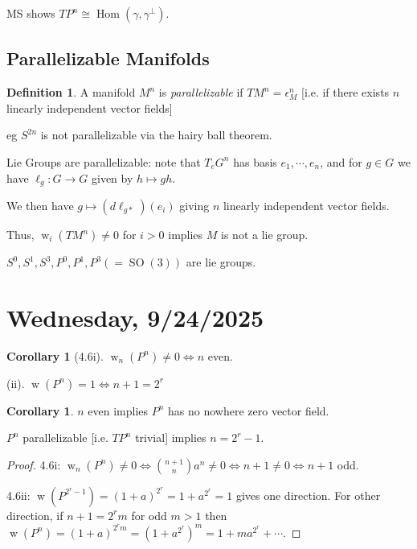 \documentclass{article}
\theoremstyle{definition}
\newtheorem*{definition}{Definition}
\newtheorem{corollary}[theorem]{Corollary}
\begin{document}
    MS shows \(TP^n \cong \operatorname{Hom} (\gamma , \gamma^{\perp})\).

    \subsection*{Parallelizable Manifolds}
    
    \begin{definition}
        A manifold \(M^n\) is \textit{parallelizable} if \(TM^n = \epsilon^n_M \) [i.e. if there exists \(n\) linearly independent vector fields]
    \end{definition}

    eg \(S^{2n}\) is not parallelizable via the hairy ball theorem.

    Lie Groups are parallelizable: note that \(T_e G^n\) has basis \(e_1, \cdots , e_n\), and for \(g\in G\) we have \(\ell_g: G \to G\) given by \(h \mapsto gh\).

    We then have \(g \mapsto (d \ell_{g \ast})(e_i)\) giving \(n\) linearly independent vector fields. 

    Thus, \(\operatorname{w}_i(TM^n) \neq 0\) for \(i > 0\) implies \(M\) is not a lie group.

    \(S^0, S^1, S^3, P^0, P^1, P^3 (=\operatorname{SO}(3))\) are lie groups.

    \section*{Wednesday, 9/24/2025}
    
    \begin{corollary}
        [4.6i] \(\operatorname{w}_n(P^n) \neq 0 \iff n\) even.

        (ii). \(\operatorname{w}(P^n) = 1 \iff n+1 = 2^r\)
    \end{corollary}

    \begin{corollary}
        \(n\) even implies \(P^n\) has no nowhere zero vector field.

        \(P^n\) parallelizable [i.e. \(TP^n\) trivial] implies \(n = 2^r - 1\). 
    \end{corollary}

    \begin{proof}
        4.6i: \(\operatorname{w}_n(P^n) \neq 0 \iff \binom{n+1}{n}a^n \neq 0 \iff n+1 \neq 0 \iff n+1\) odd.

        4.6ii: \(\operatorname{w}(P^{2^r - 1}) = (1+a)^{2^r} = 1 + a^{2^r} = 1\) gives one direction. For other direction, if \(n+1 = 2^r m\) for odd \(m > 1\) then \(\operatorname{w}(P^n) = (1+a)^{2^r m} = (1 + a^{2^r})^m = 1 + m a^{2^r} + \cdots\).

    \end{proof}
\end{document}
